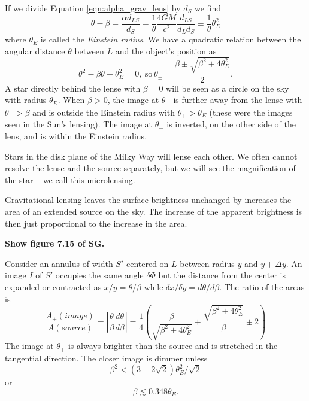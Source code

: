\documentclass[]{article}
\begin{document}
If we divide Equation \ref{eqn:alpha_grav_lens} by $d_S$
we find
\begin{equation}
\theta - \beta = \frac{\alpha d_{LS}}{d_S} = \frac{1}{\theta} \frac{4 GM}{c^2} \frac{d_{LS}}{d_L d_S} \equiv \frac{1}{\theta} \theta_E^2
\end{equation}
\noindent
where $\theta_E$ is called the {\it Einstein radius}.
We have a quadratic relation between the angular distance $\theta$ between
$L$ and the object's position as
\begin{equation}
\theta^2 - \beta \theta - \theta_E^2 = 0,~\mathrm{so}~\theta_{\pm} = \frac{\beta \pm \sqrt{\beta^2 + 4 \theta_E^2}}{2}.
\end{equation}
\noindent
A star directly behind the lense with $\beta=0$ will be seen as a circle
on the sky with radius $\theta_E$.  When $\beta>0$, the image at $\theta_{+}$
is further away from the lense with $\theta_{+}>\beta$ and is outside
the Einstein radius with $\theta_{+}>\theta_E$ (these were the images
seen in the Sun's lensing).  The image at $\theta_{-}$ is inverted, on
the other side of the lens, and is within the Einstein radius.

Stars in the disk plane of the Milky Way will lense each other.  We
often cannot resolve the lense and the source separately, but we will
see the magnification of the star -- we call this microlensing.

Gravitational lensing leaves the surface brightness unchanged by increases
the area of an extended source on the sky.  The increase of the apparent
brightness is then just proportional to the increase in the area.

{\bf Show figure 7.15 of SG.}

Consider an annulus of width $S'$ centered on $L$ between
radius $y$ and $y+\Delta y$.  An image $I$ of
$S'$ occupies the same angle $\delta \Phi$ but the distance
from the center is expanded or contracted as $x/y = \theta/\beta$
while $\delta x/\delta y= d\theta/d\beta$.  The ratio of the areas
is 
\begin{equation}
\frac{A_{\pm}(image)}{A(source)} = \left| \frac{\theta}{\beta}\frac{d\theta}{d\beta}\right| = \frac{1}{4}\left( \frac{\beta}{\sqrt{\beta^2 + 4 \theta_E^2}} + \frac{\sqrt{\beta^2 + 4 \theta_E^2}}{\beta}\pm 2 \right)
\end{equation}
\noindent
The image at $\theta_{+}$ is always brighter than the source and is stretched in the
tangential direction.  The closer image is dimmer unless
\begin{equation}
\beta^2 < (3-2\sqrt{2})\theta_E^2 / \sqrt{2}
\end{equation}
\noindent
or
\begin{equation}
\beta \lesssim 0.348 \theta_E.
\end{equation}
\end{document}
